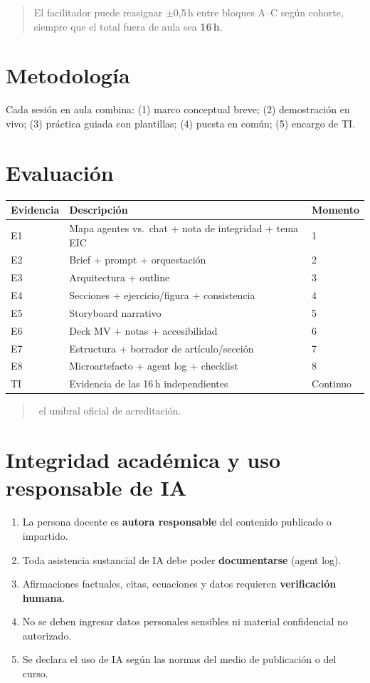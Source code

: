 \begin{quote}
El facilitador puede reasignar $\pm$0{,}5\,h entre bloques A--C según cohorte, siempre que el total fuera de aula sea \textbf{16\,h}.
\end{quote}

\section{Metodología}

Cada sesión en aula combina: (1) marco conceptual breve; (2) demostración en vivo; (3) práctica guiada con plantillas; (4) puesta en común; (5) encargo de TI.

\section{Evaluación}

\begin{tabularx}{\textwidth}{@{}lXl@{}}
\toprule
Evidencia & Descripción & Momento \\
\midrule
E1 & Mapa agentes vs.\ chat + nota de integridad + tema EIC & 1 \\
E2 & Brief + prompt + orquestación & 2 \\
E3 & Arquitectura + outline & 3 \\
E4 & Secciones + ejercicio/figura + consistencia & 4 \\
E5 & Storyboard narrativo & 5 \\
E6 & Deck MV + notas + accesibilidad & 6 \\
E7 & Estructura + borrador de artículo/sección & 7 \\
E8 & Microartefacto + agent log + checklist & 8 \\
TI & Evidencia de las 16\,h independientes & Continuo \\
\bottomrule
\end{tabularx}

\begin{quote}
\ceddie\ el umbral oficial de acreditación.
\end{quote}

\section{Integridad académica y uso responsable de IA}

\begin{enumerate}
\item La persona docente es \textbf{autora responsable} del contenido publicado o impartido.
\item Toda asistencia sustancial de IA debe poder \textbf{documentarse} (agent log).
\item Afirmaciones factuales, citas, ecuaciones y datos requieren \textbf{verificación humana}.
\item No se deben ingresar datos personales sensibles ni material confidencial no autorizado.
\item Se declara el uso de IA según las normas del medio de publicación o del curso.
\end{enumerate}

